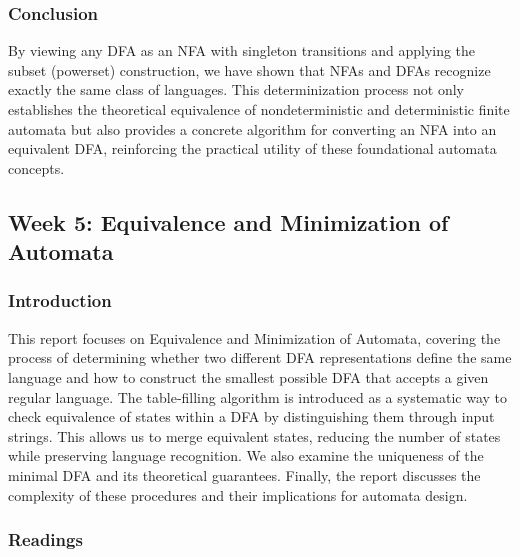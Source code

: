 \documentclass{article}
\theoremstyle{theorem}
\theoremstyle{definition}
\theoremstyle{remark}
\begin{document}
\subsubsection{Conclusion}
By viewing any DFA as an NFA with singleton transitions and applying the subset (powerset) construction, we have shown that NFAs and DFAs recognize exactly the same class of languages.  This determinization process not only establishes the theoretical equivalence of nondeterministic and deterministic finite automata but also provides a concrete algorithm for converting an NFA into an equivalent DFA, reinforcing the practical utility of these foundational automata concepts.

\newpage

\subsection{Week 5: Equivalence and Minimization of Automata}

\subsubsection{Introduction}
This report focuses on Equivalence and Minimization of Automata, covering the process of determining whether two different DFA representations define the same language and how to construct the smallest possible DFA that accepts a given regular language. The table‐filling algorithm is introduced as a systematic way to check equivalence of states within a DFA by distinguishing them through input strings. This allows us to merge equivalent states, reducing the number of states while preserving language recognition. We also examine the uniqueness of the minimal DFA and its theoretical guarantees. Finally, the report discusses the complexity of these procedures and their implications for automata design.

\subsubsection{Readings}
\end{document}
